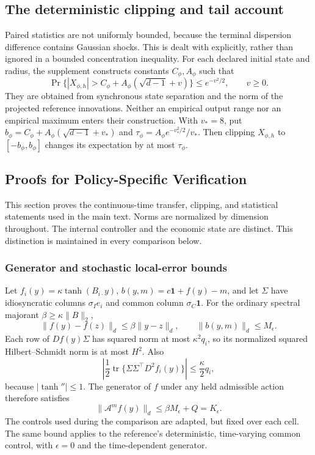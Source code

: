 \subsection{The deterministic clipping and tail account}
\label{app:r15capitaltail}

Paired statistics are not uniformly bounded, because the terminal dispersion difference contains Gaussian shocks. This is dealt with explicitly, rather than ignored in a bounded concentration inequality. For each declared initial state and radius, the supplement constructs constants $C_\phi,A_\phi$ such that
\[
 \Pr\{|X_{\phi,h}|>C_\phi+A_\phi(\sqrt{d-1}+v)\}
       \leq e^{-v^2/2},\qquad v\geq0.
\]
They are obtained from synchronous state separation and the norm of the projected reference innovations. Neither an empirical output range nor an empirical maximum enters their construction. With $v_*=8$, put
$b_\phi=C_\phi+A_\phi(\sqrt{d-1}+v_*)$ and
$\tau_\phi=A_\phi e^{-v_*^2/2}/v_*$.
Then clipping $X_{\phi,h}$ to $[-b_\phi,b_\phi]$ changes its expectation by at most $\tau_\phi$.

\subsection{Proofs for Policy-Specific Verification}\label{app:r11proofs}
This section proves the continuous-time transfer, clipping, and statistical statements used in the main text. Norms are normalized by dimension throughout. The internal controller and the economic state are distinct. This distinction is maintained in every comparison below.

\subsubsection{Generator and stochastic local-error bounds}
Let $f_i(y)=\kappa\tanh(B_{i\cdot}y)$, $b(y,m)=c\bm1+f(y)-m$, and let $\Sigma$ have idiosyncratic columns $\sigma_I e_i$ and common column $\sigma_C\bm1$. For the ordinary spectral majorant $\beta\geq\kappa\|B\|_2$,
\[
 \|f(y)-f(z)\|_d\leq\beta\|y-z\|_d,
 \qquad \|b(y,m)\|_d\leq M_\epsilon.
\]
Each row of $D f(y)\Sigma$ has squared norm at most $\kappa^2q_i$, so its normalized squared Hilbert--Schmidt norm is at most $H^2$. Also
\[
 \left|\frac12\operatorname{tr}\{\Sigma\Sigma^\top D^2 f_i(y)\}\right|
 \leq\frac\kappa2 q_i,
\]
because $|\tanh''|\leq1$. The generator of $f$ under any held admissible action therefore satisfies
\begin{equation}\label{eq:r11generator}
 \|\mathcal A^m f(y)\|_d\leq\beta M_\epsilon+Q=K_\epsilon.
\end{equation}
The controls used during the comparison are adapted, but fixed over each cell. The same bound applies to the reference's deterministic, time-varying common control, with $\epsilon=0$ and the time-dependent generator.

